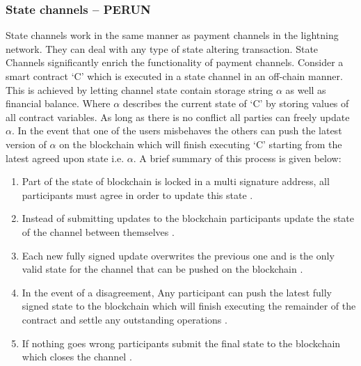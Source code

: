 \subsubsection{State channels – PERUN}
State channels work in the same manner as payment channels in the lightning network. They can deal with any type of state altering transaction. State Channels significantly enrich the functionality of payment channels. Consider a smart contract ‘C’ which is executed in a state channel in an off-chain manner. This is achieved by letting channel state contain storage string $\alpha$ as well as financial balance. Where $\alpha$ describes the current state of ‘C’ by storing values of all contract variables. As long as there is no conflict all parties can freely update $\alpha$. In the event that one of the users misbehaves the others can push the latest version of $\alpha$ on the blockchain which will finish executing ‘C’ starting from the latest agreed upon state i.e. $\alpha$. A brief summary of this process is given below: \cite{misc:012}
\begin{enumerate}

\item Part of the state of blockchain is locked in a multi signature address, all participants must agree in order to update this state \cite{misc:012}.
\item 
Instead of submitting updates to the blockchain participants update the state of the channel between themselves \cite{misc:012}.
\item Each new fully signed update overwrites the previous one and is the only valid state for the channel that can be pushed on the blockchain \cite{misc:012}.
\item In the event of a disagreement, Any participant can push the latest fully signed state to the blockchain which will finish executing the remainder of the contract and settle any outstanding operations \cite{misc:012}.
\item If nothing goes wrong participants submit the final state to the blockchain which closes the channel \cite{ misc:012}.

\end{enumerate}
